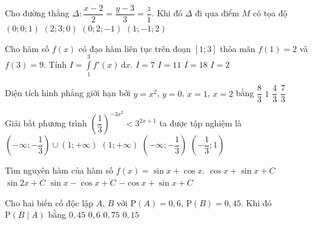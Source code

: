 \begin{ex}
	Cho đường thẳng $\Delta \colon \dfrac{x-2}{2}=\dfrac{y-3}{3}=\dfrac{z}{1}$. Khi đó $\Delta$ đi qua điểm $M$ có tọa độ
	\choice
	{$\left(0;0;1\right)$}
	{\True $\left(2;3;0\right)$}
	{$\left(0;2;-1\right)$}
	{$\left(1;-1;2\right)$}
\end{ex}

\begin{ex}
	Cho hàm số $f(x)$ có đạo hàm liên tục trên đoạn $\left[1;3\right]$ thỏa mãn $f(1)=2$ và $f(3)=9$. Tính
	$I=\displaystyle\int \limits_{1}^{3}f'(x)\mathrm{\,d}x$.
	\choice
	{\True $I=7$}
	{$I=11$}
	{$I=18$}
	{$I=2$}
\end{ex}

\begin{ex}
	Diện tích hình phẳng giới hạn bởi $y=x^2$, $y=0$, $x=1$, $x=2$ bằng
	\choice
	{$\dfrac{8}{3}$}
	{$1$}
	{$\dfrac{4}{3}$}
	{\True $\dfrac{7}{3}$}
\end{ex}

\begin{ex}
	Giải bất phương trình $\left(\dfrac{1}{3}\right)^{-3x^2}<3^{2x+1}$ ta được tập nghiệm là
	\choice
	{$\left(-\infty;-\dfrac{1}{3}\right)\cup \left(1;+\infty\right)$}
	{$\left(1;+\infty\right)$}
	{$\left(-\infty;-\dfrac{1}{3}\right)$}
	{\True $\left(-\dfrac{1}{3};1\right)$}
\end{ex}

\begin{ex}
	Tìm nguyên hàm của hàm số $f(x)=\sin x+\cos x$.
	\choice
	{$\cos x+\sin x+C$}
	{$\sin 2x+C$}
	{$\sin x-\cos x+C$}
	{\True $-\cos x+\sin x+C$}
\end{ex}

\begin{ex}
	Cho hai biến cố độc lập $A$, $B$ với $\mathrm{P}(A)=0{,}6$, $\mathrm{P}(B)=0{,}45$. Khi đó $\mathrm{P}(B\mid A)$ bằng
	\choice
	{$0{,}45$}
	{$0{,}6$}
	{$0{,}75$}
	{$0{,}15$}
\end{ex}

